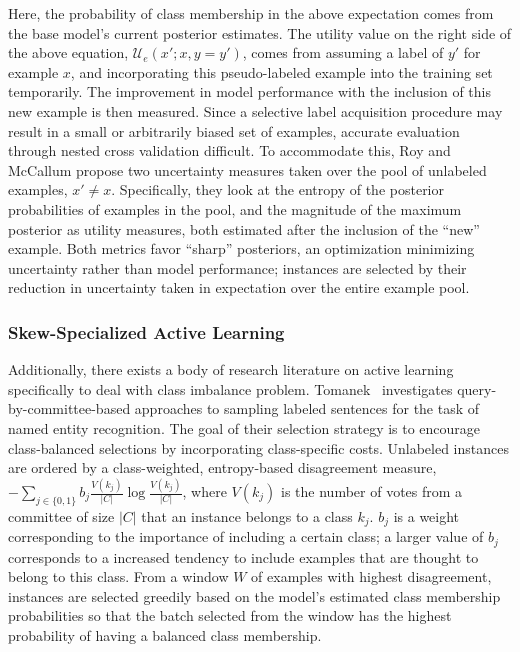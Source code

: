 Here, the probability of class membership in the above expectation comes from the base model's current posterior estimates. The utility value on the right side of the above equation, $\mathcal{U}_e(x';x,y=y')$, comes from assuming a label of $y'$ for example $x$, and incorporating this pseudo-labeled example into the training set temporarily. The improvement in model performance with the inclusion of this new example is then measured. Since a selective label acquisition procedure may result in a small or arbitrarily biased set of examples, accurate evaluation through nested cross validation difficult. To accommodate this, Roy and McCallum propose two uncertainty measures taken over the pool of unlabeled examples, $x' \ne x$. Specifically, they look at the entropy of the posterior probabilities of examples in the pool, and the magnitude of the maximum posterior as utility measures, both estimated after the inclusion of the ``new'' example. Both metrics favor ``sharp'' posteriors, an optimization minimizing uncertainty rather than model performance; instances are selected by their reduction in uncertainty taken in expectation over the entire example pool.

\subsubsection{Skew-Specialized Active Learning}
\label{sec:skewal}

Additionally, there exists a body of research literature on active learning specifically to deal with class imbalance problem. Tomanek~\cite{tomanek2009imbalance} investigates query-by-committee-based approaches to sampling labeled sentences for the task of named entity recognition. The goal of their selection strategy is to encourage class-balanced selections by incorporating class-specific costs. Unlabeled instances are ordered by a class-weighted, entropy-based disagreement measure,     $ -\sum_{j \in \{0,1\}} b_j   \frac{V(k_j)}{|C|}\log \frac{V(k_j)}{|C|}$, where $V(k_j)$ is the number of                           votes from a committee of size $|C|$ that an instance belongs to a class   $k_j$. $b_j$ is a weight corresponding to the importance of including a  certain class; a larger value of $b_j$ corresponds to a increased tendency   to include examples that are thought to belong to this class. From a window  $W$ of examples with highest disagreement, instances are selected greedily   based on the model's estimated class membership probabilities so that the batch selected from the window has the highest probability of having a  balanced class membership.

